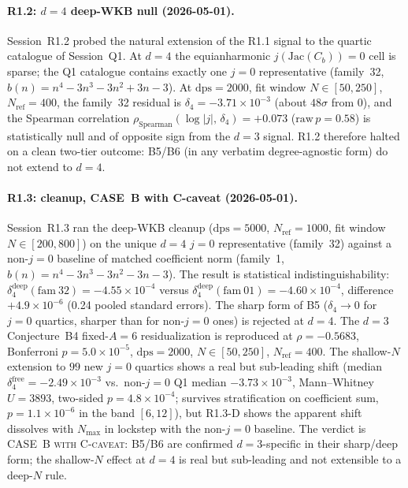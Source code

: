 \documentclass[11pt,a4paper]{article}
\theoremstyle{definition}
\theoremstyle{remark}
\begin{document}
\paragraph{R1.2: $d=4$ deep-WKB null (2026-05-01).}
Session~R1.2 probed the natural extension of the R1.1 signal to the
quartic catalogue of Session~Q1. At $d=4$ the equianharmonic
$j(\mathrm{Jac}(C_b))=0$ cell is sparse; the Q1 catalogue contains
exactly one $j=0$ representative (family~32,
$b(n)=n^4-3n^3-3n^2+3n-3$). At $\mathrm{dps}=2000$, fit window
$N\in[50,250]$, $N_{\mathrm{ref}}=400$, the family~32 residual is
$\delta_4 = -3.71\times 10^{-3}$ (about $48\sigma$ from $0$), and
the Spearman correlation
$\rho_{\mathrm{Spearman}}(\log|j|,\,\delta_4) = +0.073$
($\mathrm{raw}\,p = 0.58$) is statistically null and of opposite
sign from the $d=3$ signal. R1.2 therefore halted on a clean
two-tier outcome: B5/B6 (in any verbatim degree-agnostic form) do
not extend to $d=4$.

\paragraph{R1.3: cleanup, CASE~B with C-caveat (2026-05-01).}
Session~R1.3 ran the deep-WKB cleanup ($\mathrm{dps}=5000$,
$N_{\mathrm{ref}}=1000$, fit window $N\in[200,800]$) on the unique
$d=4$ $j=0$ representative (family~32) against a non-$j=0$ baseline
of matched coefficient norm (family~1, $b(n)=n^4-3n^3-3n^2-3n-3$).
The result is statistical indistinguishability:
$\delta^{\mathrm{deep}}_4(\mathrm{fam}~32) = -4.55\times 10^{-4}$
versus
$\delta^{\mathrm{deep}}_4(\mathrm{fam}~01) = -4.60\times 10^{-4}$,
difference $+4.9\times 10^{-6}$ (0.24 pooled standard errors). The
sharp form of B5 ($\delta_4\to 0$ for $j=0$ quartics, sharper than
for non-$j=0$ ones) is rejected at $d=4$. The $d=3$ Conjecture~B4
fixed-$A=6$ residualization is reproduced at $\rho=-0.5683$,
Bonferroni $p=5.0\times 10^{-5}$, $\mathrm{dps}=2000$,
$N\in[50,250]$, $N_{\mathrm{ref}}=400$. The shallow-$N$ extension
to $99$ new $j=0$ quartics shows a real but sub-leading shift
(median $\delta^{\mathrm{free}}_4 = -2.49\times 10^{-3}$ vs.\
non-$j=0$ Q1 median $-3.73\times 10^{-3}$, Mann--Whitney
$U=3893$, two-sided $p=4.8\times 10^{-4}$; survives stratification
on coefficient sum, $p=1.1\times 10^{-6}$ in the band
$[6,12]$), but R1.3-D shows the apparent shift dissolves with
$N_{\max}$ in lockstep with the non-$j=0$ baseline. The verdict is
\textsc{CASE~B with C-caveat}: B5/B6 are confirmed $d=3$-specific
in their sharp/deep form; the shallow-$N$ effect at $d=4$ is real but
sub-leading and not extensible to a deep-$N$ rule.
\end{document}
